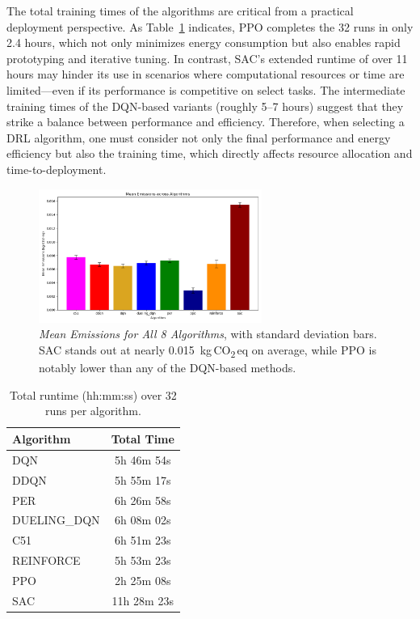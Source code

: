 The total training times of the algorithms are critical from a practical deployment perspective. As Table~\ref{tab:total_runtimes} indicates, PPO completes the 32 runs in only 2.4 hours, which not only minimizes energy consumption but also enables rapid prototyping and iterative tuning. In contrast, SAC's extended runtime of over 11 hours may hinder its use in scenarios where computational resources or time are limited—even if its performance is competitive on select tasks. The intermediate training times of the DQN-based variants (roughly 5–7 hours) suggest that they strike a balance between performance and efficiency. Therefore, when selecting a DRL algorithm, one must consider not only the final performance and energy efficiency but also the training time, which directly affects resource allocation and time-to-deployment.

\begin{figure} 
	\centering
	\includegraphics[width=0.65\textwidth]{figures/comparison/barplot_emissions_total.png}
	\caption{\emph{Mean Emissions for All 8 Algorithms}, with standard deviation bars.
		SAC stands out at nearly 0.015~kg\,CO\textsubscript{2}\,eq on average, while PPO is notably lower than
		any of the DQN-based methods.}
	\label{fig:barplot_emissions_total}
\end{figure}

\begin{table} 
	\centering
	\caption{Total runtime (hh:mm:ss) over 32 runs per algorithm.}
	\label{tab:total_runtimes}
	\begin{tabular}{lc}
		\toprule
		\textbf{Algorithm} & \textbf{Total Time} \\
		\midrule
		DQN          & 5h 46m 54s \\
		DDQN         & 5h 55m 17s \\
		PER          & 6h 26m 58s \\
		DUELING\_DQN & 6h 08m 02s \\
		C51          & 6h 51m 23s \\
		REINFORCE    & 5h 53m 23s \\
		PPO          & 2h 25m 08s \\
		SAC          & 11h 28m 23s \\
		\bottomrule
	\end{tabular}
\end{table}

